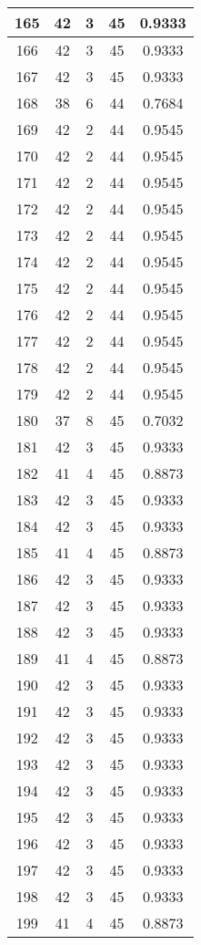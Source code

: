 \documentclass[letterpaper, 12pt]{article}
\begin{document}
\begin{longtable}{|c|c|c|c|c|}
\hline
165 & 42 & 3 & 45 & 0.9333 \\
\hline
166 & 42 & 3 & 45 & 0.9333 \\
\hline
167 & 42 & 3 & 45 & 0.9333 \\
\hline
168 & 38 & 6 & 44 & 0.7684 \\
\hline
169 & 42 & 2 & 44 & 0.9545 \\
\hline
170 & 42 & 2 & 44 & 0.9545 \\
\hline
171 & 42 & 2 & 44 & 0.9545 \\
\hline
172 & 42 & 2 & 44 & 0.9545 \\
\hline
173 & 42 & 2 & 44 & 0.9545 \\
\hline
174 & 42 & 2 & 44 & 0.9545 \\
\hline
175 & 42 & 2 & 44 & 0.9545 \\
\hline
176 & 42 & 2 & 44 & 0.9545 \\
\hline
177 & 42 & 2 & 44 & 0.9545 \\
\hline
178 & 42 & 2 & 44 & 0.9545 \\
\hline
179 & 42 & 2 & 44 & 0.9545 \\
\hline
180 & 37 & 8 & 45 & 0.7032 \\
\hline
181 & 42 & 3 & 45 & 0.9333 \\
\hline
182 & 41 & 4 & 45 & 0.8873 \\
\hline
183 & 42 & 3 & 45 & 0.9333 \\
\hline
184 & 42 & 3 & 45 & 0.9333 \\
\hline
185 & 41 & 4 & 45 & 0.8873 \\
\hline
186 & 42 & 3 & 45 & 0.9333 \\
\hline
187 & 42 & 3 & 45 & 0.9333 \\
\hline
188 & 42 & 3 & 45 & 0.9333 \\
\hline
189 & 41 & 4 & 45 & 0.8873 \\
\hline
190 & 42 & 3 & 45 & 0.9333 \\
\hline
191 & 42 & 3 & 45 & 0.9333 \\
\hline
192 & 42 & 3 & 45 & 0.9333 \\
\hline
193 & 42 & 3 & 45 & 0.9333 \\
\hline
194 & 42 & 3 & 45 & 0.9333 \\
\hline
195 & 42 & 3 & 45 & 0.9333 \\
\hline
196 & 42 & 3 & 45 & 0.9333 \\
\hline
197 & 42 & 3 & 45 & 0.9333 \\
\hline
198 & 42 & 3 & 45 & 0.9333 \\
\hline
199 & 41 & 4 & 45 & 0.8873 \\
\hline
\end{longtable}
\end{document}
